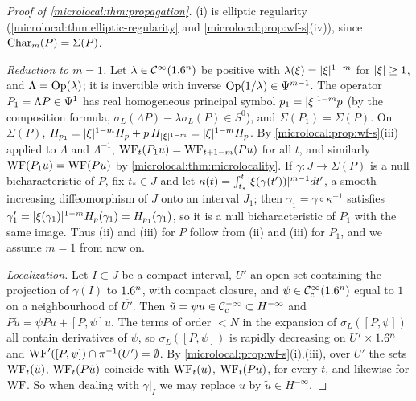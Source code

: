 \begin{proof}[Proof of \cref{microlocal:thm:propagation}]
  (i) is elliptic regularity (\cref{microlocal:thm:elliptic-regularity} and
  \cref{microlocal:prop:wf-s}(iv)), since $\operatorname{Char}_m(P)=\Sigma(P)$.

  \emph{Reduction to $m=1$.} Let $\lambda\in\mathcal{C}^\infty(1.6^n)$ be positive with
  $\lambda(\xi)=\lvert \xi\rvert^{1-m}$ for $\lvert \xi\rvert\ge1$, and $\Lambda=\operatorname{Op}(\lambda)$; it is
  invertible with inverse $\operatorname{Op}(1/\lambda)\in\Psi^{m-1}$. The operator
  $P_1=\Lambda P\in\Psi^{1}$ has real homogeneous principal symbol
  $p_1=\lvert \xi\rvert^{1-m}p$ (by the composition formula,
  $\sigma_L(\Lambda P)-\lambda\sigma_L(P)\in S^0$), and $\Sigma(P_1)=\Sigma(P)$. On
  $\Sigma(P)$, $H_{p_1}=\lvert \xi\rvert^{1-m}H_{p}+p\,H_{\lvert \xi\rvert^{1-m}}=\lvert \xi\rvert^{1-m}H_{p}$. By
  \cref{microlocal:prop:wf-s}(iii) applied to $\Lambda$ and $\Lambda^{-1}$,
  $\operatorname{WF}_t(P_1u)=\operatorname{WF}_{t+1-m}(Pu)$ for all $t$, and similarly
  $\operatorname{WF}(P_1u)=\operatorname{WF}(Pu)$ by \cref{microlocal:thm:microlocality}. If
  $\gamma:J\to\Sigma(P)$ is a null bicharacteristic of $P$, fix $t_*\in J$ and let
  $\kappa(t)=\int_{t_*}^t\lvert \xi(\gamma(t'))\rvert^{m-1}dt'$, a smooth increasing
  diffeomorphism of $J$ onto an interval $J_1$; then
  $\gamma_1=\gamma\circ\kappa^{-1}$ satisfies
  $\gamma_1'=\lvert \xi(\gamma_1)\rvert^{1-m}H_{p}(\gamma_1)=H_{p_1}(\gamma_1)$, so it is a null
  bicharacteristic of $P_1$ with the same image. Thus (ii) and (iii) for $P$
  follow from (ii) and (iii) for $P_1$, and we assume $m=1$ from now on.

  \emph{Localization.} Let $I\subset J$ be a compact interval, $U'$ an open
  set containing the projection of $\gamma(I)$ to $1.6^n$, with compact closure,
  and $\psi\in\mathcal{C}^\infty_{\mathrm{c}}(1.6^n)$ equal to $1$ on a neighbourhood of $\overline{U'}$. Then
  $\tilde u=\psi u\in\mathcal{C}^{-\infty}_{\mathrm{c}}\subset H^{-\infty}$ and $P\tilde u=\psi Pu+[P,\psi]u$. The
  terms of order $<N$ in the expansion of $\sigma_L([P,\psi])$ all contain
  derivatives of $\psi$, so $\sigma_L([P,\psi])$ is rapidly decreasing on
  $U'\times1.6^n$ and $\operatorname{WF}'([P,\psi])\cap\pi^{-1}(U')=\emptyset$. By
  \cref{microlocal:prop:wf-s}(i),(iii), over $U'$ the sets $\operatorname{WF}_t(\tilde u)$,
  $\operatorname{WF}_t(P\tilde u)$ coincide with $\operatorname{WF}_t(u)$, $\operatorname{WF}_t(Pu)$, for every $t$, and
  likewise for $\operatorname{WF}$. So when dealing with $\gamma|_I$ we may replace $u$ by
  $\tilde u\in H^{-\infty}$.


\end{proof}
